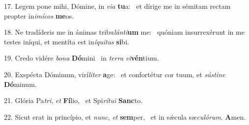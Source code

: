 17. Legem pone mihi, Dómine, in \textit{vi}\textit{a} \textbf{tu}a: \ast\  et dírige me in sémitam rectam propter in\textit{i}\textit{mí}\textit{cos} \textbf{me}os.\

18. Ne tradíderis me in ánimas tribu\textit{lán}\textit{ti}\textbf{um} me: \ast\  quóniam insurrexérunt in me testes iníqui, et mentíta est in\textit{í}\textit{qui}\textit{tas} \textbf{si}bi.\

19. Credo vidére \textit{bo}\textit{na} \textbf{Dó}mini \ast\  in \textit{ter}\textit{ra} \textit{vi}\textbf{vén}tium.\

20. Exspécta Dóminum, virí\textit{li}\textit{ter} \textbf{a}ge: \ast\  et confortétur cor tuum, et \textit{sús}\textit{ti}\textit{ne} \textbf{Dó}minum.\

21. Glória Pa\textit{tri}, \textit{et} \textbf{Fí}lio, \ast\  et Spi\textit{rí}\textit{tu}\textit{i} \textbf{Sanc}to.\

22. Sicut erat in princípio, et \textit{nunc}, \textit{et} \textbf{sem}per, \ast\  et in sǽcula sæ\textit{cu}\textit{ló}\textit{rum}. \textbf{A}men.\

